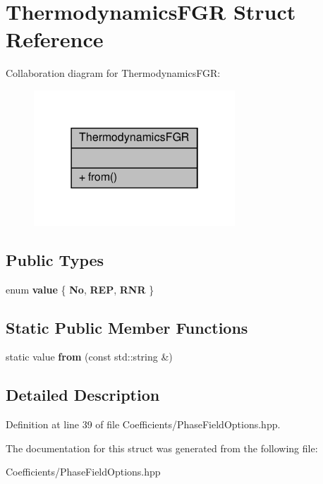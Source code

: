 \hypertarget{structThermodynamicsFGR}{}\section{Thermodynamics\+F\+GR Struct Reference}
\label{structThermodynamicsFGR}


Collaboration diagram for Thermodynamics\+F\+GR\+:\nopagebreak
\begin{figure}[H]
\begin{center}
\leavevmode
\includegraphics[width=214pt]{structThermodynamicsFGR__coll__graph}
\end{center}
\end{figure}
\subsection*{Public Types}
\begin{DoxyCompactItemize}
\item 
\mbox{\label{structThermodynamicsFGR_a4bd2ae2bee0bc1468d48c689ab937f81}} 
enum {\bfseries value} \{ {\bfseries No}, 
{\bfseries R\+EP}, 
{\bfseries R\+NR}
 \}
\end{DoxyCompactItemize}
\subsection*{Static Public Member Functions}
\begin{DoxyCompactItemize}
\item 
\mbox{\label{structThermodynamicsFGR_ae8f8aaf61c1685ff086e7bf3828f12f4}} 
static value {\bfseries from} (const std\+::string \&)
\end{DoxyCompactItemize}


\subsection{Detailed Description}


Definition at line 39 of file Coefficients/\+Phase\+Field\+Options.\+hpp.



The documentation for this struct was generated from the following file\+:\begin{DoxyCompactItemize}
\item 
Coefficients/\+Phase\+Field\+Options.\+hpp\end{DoxyCompactItemize}
